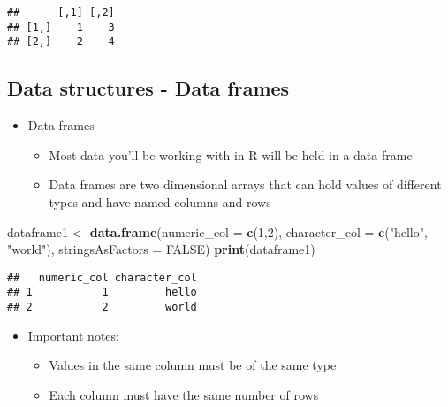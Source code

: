 \documentclass[]{article}
\newenvironment{Shaded}{\begin{snugshade}}{\end{snugshade}}
\newcommand{\KeywordTok}[1]{\textcolor[rgb]{0.13,0.29,0.53}{\textbf{#1}}}
\newcommand{\DataTypeTok}[1]{\textcolor[rgb]{0.13,0.29,0.53}{#1}}
\newcommand{\DecValTok}[1]{\textcolor[rgb]{0.00,0.00,0.81}{#1}}
\newcommand{\StringTok}[1]{\textcolor[rgb]{0.31,0.60,0.02}{#1}}
\newcommand{\OtherTok}[1]{\textcolor[rgb]{0.56,0.35,0.01}{#1}}
\newcommand{\NormalTok}[1]{#1}
\providecommand{\tightlist}{%
  \setlength{\itemsep}{0pt}\setlength{\parskip}{0pt}}
\begin{document}
\begin{verbatim}
##      [,1] [,2]
## [1,]    1    3
## [2,]    2    4
\end{verbatim}

\subsection{Data structures - Data
frames}\label{data-structures---data-frames}

\begin{itemize}
\tightlist
\item
  Data frames

  \begin{itemize}
  \tightlist
  \item
    Most data you'll be working with in R will be held in a data frame
  \item
    Data frames are two dimensional arrays that can hold values of
    different types and have named columns and rows
  \end{itemize}
\end{itemize}

\begin{Shaded}
\begin{Highlighting}[]
\NormalTok{dataframe1 <-}\StringTok{ }\KeywordTok{data.frame}\NormalTok{(}\DataTypeTok{numeric_col =} \KeywordTok{c}\NormalTok{(}\DecValTok{1}\NormalTok{,}\DecValTok{2}\NormalTok{), }\DataTypeTok{character_col =} \KeywordTok{c}\NormalTok{(}\StringTok{"hello"}\NormalTok{, }\StringTok{"world"}\NormalTok{), }\DataTypeTok{stringsAsFactors =} \OtherTok{FALSE}\NormalTok{)}
\KeywordTok{print}\NormalTok{(dataframe1)}
\end{Highlighting}
\end{Shaded}

\begin{verbatim}
##   numeric_col character_col
## 1           1         hello
## 2           2         world
\end{verbatim}

\begin{itemize}
\tightlist
\item
  Important notes:

  \begin{itemize}
  \tightlist
  \item
    Values in the same column must be of the same type
  \item
    Each column must have the same number of rows
  \end{itemize}
\end{itemize}
\end{document}
